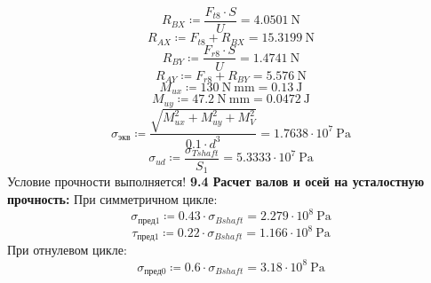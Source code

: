 \documentclass{article}
\newcommand{\defeq}{\coloneq} %
\begin{document}
\begin{equation*}
R_{BX} \defeq \frac{\textit{F}_{\textit{t8}} \cdot S}{U} = {4.0501 \: \mathrm{N}}
\end{equation*}
\begin{equation*}
R_{AX} \defeq \textit{F}_{\textit{t8}}+R_{BX} = {15.3199 \: \mathrm{N}}
\end{equation*}
\begin{equation*}
R_{BY} \defeq \frac{\textit{F}_{\textit{r8}} \cdot S}{U} = {1.4741 \: \mathrm{N}}
\end{equation*}
\begin{equation*}
R_{AY} \defeq \textit{F}_{\textit{r8}}+R_{BY} = {5.576 \: \mathrm{N}}
\end{equation*}
\begin{equation*}
M_{ux} \defeq 130 \: \mathrm{N} \: \mathrm{mm} = {0.13 \: \mathrm{J}}
\end{equation*}
\begin{equation*}
M_{uy} \defeq 47.2 \: \mathrm{N} \: \mathrm{mm} = {0.0472 \: \mathrm{J}}
\end{equation*}
\begin{equation*}
σ_{экв} \defeq \frac{\sqrt{M_{ux}^{2}+M_{uy}^{2}+M_{V}^{2}}}{0.1 \cdot d^{3}} = {1.7638 \cdot 10^{7} \: \mathrm{Pa}}
\end{equation*}
\begin{equation*}
σ_{ud} \defeq \frac{σ_{Tshaft}}{\textit{S}_{\textit{1}}} = {5.3333 \cdot 10^{7} \: \mathrm{Pa}}
\end{equation*}
\colorbox[HTML]{FFFF80}{Условие прочности выполняется!}\newline
\colorbox[HTML]{000000}{\textbf{9.4 Расчет валов и осей на усталостную прочность:}}\newline
\colorbox[HTML]{000000}{При симметричном цикле:}\newline
\begin{equation*}
\textit{σ}_{\textit{пред1}} \defeq 0.43 \cdot σ_{Bshaft} = {2.279 \cdot 10^{8} \: \mathrm{Pa}}
\end{equation*}
\begin{equation*}
\textit{τ}_{\textit{пред1}} \defeq 0.22 \cdot σ_{Bshaft} = {1.166 \cdot 10^{8} \: \mathrm{Pa}}
\end{equation*}
\colorbox[HTML]{000000}{При отнулевом цикле:}\newline
\begin{equation*}
\textit{σ}_{\textit{пред0}} \defeq 0.6 \cdot σ_{Bshaft} = {3.18 \cdot 10^{8} \: \mathrm{Pa}}
\end{equation*}
\end{document}
